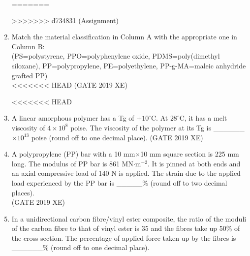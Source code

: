 \documentclass[journal,12pt,onecolumn]{IEEEtran}
\begin{document}
\begin{enumerate}
\newpage
=======

\vspace{0.5cm}
>>>>>>> d734831 (Assignment)

\item Match the material classification in Column A with the appropriate one in Column B:\\
(PS=polystyrene, PPO=polyphenylene oxide, PDMS=poly(dimethyl siloxane), PP=polypropylene, PE=polyethylene, PP-g-MA=maleic anhydride grafted PP)\\



<<<<<<< HEAD
\hfill{(GATE 2019 XE)} \\
\begin{multicols}{2}
<<<<<<< HEAD
\end{multicols}

\item A linear amorphous polymer has a Tg of $+10^\circ$C. At $28^\circ$C, it has a melt viscosity of $4\times10^{8}$ poise. The viscosity of the polymer at its Tg is \_\_\_\_\_\_ $\times10^{13}$ poise (round off to one decimal place).
\hfill{(GATE 2019 XE)} \\


\item A polypropylene (PP) bar with a 10 mm$\times$10 mm square section is 225 mm long. The modulus of PP bar is 861 MN$\cdot$m$^{-2}$. It is pinned at both ends and an axial compressive load of 140 N is applied. The strain due to the applied load experienced by the PP bar is \_\_\_\_\_\% (round off to two decimal places).\\
\hfill{(GATE 2019 XE)} \\

\item In a unidirectional carbon fibre/vinyl ester composite, the ratio of the moduli of the carbon fibre to that of vinyl ester is 35 and the fibres take up 50\% of the cross-section. The percentage of applied force taken up by the fibres is \_\_\_\_\_\_\% (round off to one decimal place).


\end{enumerate}
\end{document}
